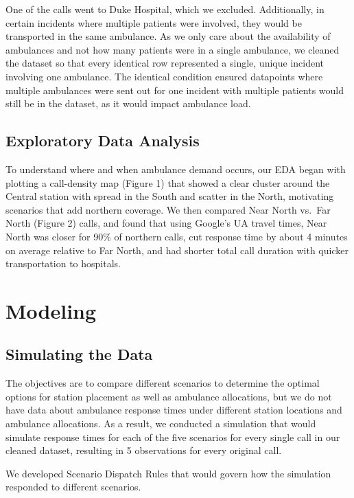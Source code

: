 \documentclass[
  11pt,
]{article}
\begin{document}
One of the calls went to Duke Hospital, which we excluded. Additionally,
in certain incidents where multiple patients were involved, they would
be transported in the same ambulance. As we only care about the
availability of ambulances and not how many patients were in a single
ambulance, we cleaned the dataset so that every identical row
represented a single, unique incident involving one ambulance. The
identical condition ensured datapoints where multiple ambulances were
sent out for one incident with multiple patients would still be in the
dataset, as it would impact ambulance load.

\subsection{Exploratory Data Analysis}\label{exploratory-data-analysis}

To understand where and when ambulance demand occurs, our EDA began with
plotting a call-density map (Figure 1) that showed a clear cluster
around the Central station with spread in the South and scatter in the
North, motivating scenarios that add northern coverage. We then compared
Near North vs.~Far North (Figure 2) calls, and found that using Google's
UA travel times, Near North was closer for 90\% of northern calls, cut
response time by about 4 minutes on average relative to Far North, and
had shorter total call duration with quicker transportation to
hospitals.

\section{Modeling}\label{modeling}

\subsection{Simulating the Data}\label{simulating-the-data}

The objectives are to compare different scenarios to determine the
optimal options for station placement as well as ambulance allocations,
but we do not have data about ambulance response times under different
station locations and ambulance allocations. As a result, we conducted a
simulation that would simulate response times for each of the five
scenarios for every single call in our cleaned dataset, resulting in 5
observations for every original call.

We developed Scenario Dispatch Rules that would govern how the
simulation responded to different scenarios.
\end{document}
